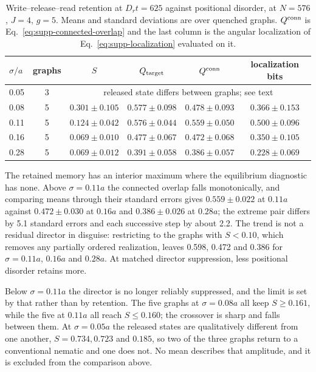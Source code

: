 \documentclass[aps,prl,onecolumn,superscriptaddress,nofootinbib]{revtex4-2}
\begin{document}
\begin{table}[ht]
\centering
\caption{Write--release--read retention at \(D_rt=625\) against positional
disorder, at \(N=576\), \(J=4\), \(g=5\).  Means and standard deviations are
over quenched graphs.  \(Q^{\rm conn}\) is Eq.~\eqref{eq:supp-connected-overlap}
and the last column is the angular localization of
Eq.~\eqref{eq:supp-localization} evaluated on it.}
\label{tab:supp-disorder-retention}
\begin{ruledtabular}
\begin{tabular}{lccccc}
\(\sigma/a\)&graphs&\(S\)&\(Q_{\rm target}\)&\(Q^{\rm conn}\)&localization bits\\
\hline
0.05&3&\multicolumn{4}{c}{released state differs between graphs; see text}\\
0.08&5&\(0.301\pm0.105\)&\(0.577\pm0.098\)&\(0.478\pm0.093\)&\(0.366\pm0.153\)\\
0.11&5&\(0.124\pm0.042\)&\(0.576\pm0.044\)&\(0.559\pm0.050\)&\(0.500\pm0.096\)\\
0.16&5&\(0.069\pm0.010\)&\(0.477\pm0.067\)&\(0.472\pm0.068\)&\(0.350\pm0.105\)\\
0.28&5&\(0.069\pm0.012\)&\(0.391\pm0.058\)&\(0.386\pm0.057\)&\(0.228\pm0.069\)\\
\end{tabular}
\end{ruledtabular}
\end{table}

The retained memory has an interior maximum where the equilibrium diagnostic
has none.  Above \(\sigma=0.11a\) the connected overlap falls monotonically,
and comparing means through their standard errors gives
\(0.559\pm0.022\) at \(0.11a\) against \(0.472\pm0.030\) at \(0.16a\) and
\(0.386\pm0.026\) at \(0.28a\); the extreme pair differs by 5.1 standard
errors and each successive step by about 2.2.  The trend is not a residual
director in disguise: restricting to the graphs with \(S<0.10\), which
removes any partially ordered realization, leaves 0.598, 0.472 and 0.386 for
\(\sigma=0.11a\), \(0.16a\) and \(0.28a\).  At matched director suppression,
less positional disorder retains more.

Below \(\sigma=0.11a\) the director is no longer reliably suppressed, and the
limit is set by that rather than by retention.  The five graphs at
\(\sigma=0.08a\) all keep \(S\geq0.161\), while the five at \(0.11a\) all
reach \(S\leq0.160\); the crossover is sharp and falls between them.  At
\(\sigma=0.05a\) the released states are qualitatively different from one
another, \(S=0.734,0.723\) and \(0.185\), so two of the three graphs return
to a conventional nematic and one does not.  No mean describes that
amplitude, and it is excluded from the comparison above.
\end{document}
